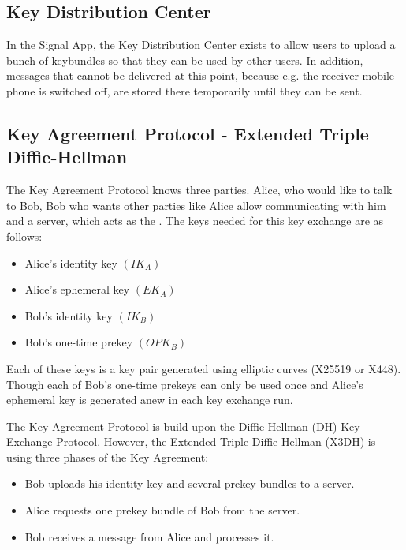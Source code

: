 \documentclass[12pt,oneside,a4paper,parskip]{scrbook}
\begin{document}



\subsection*{Key Distribution Center}
\label{subsec:KDC}

In the Signal App, the Key Distribution Center exists to allow users to upload a bunch of keybundles so that they can be used by other users. In addition, messages that cannot be delivered at this point, because e.g. the receiver mobile phone is switched off, are stored there temporarily until they can be sent.

\subsection{Key Agreement Protocol - Extended Triple Diffie-Hellman}
The Key Agreement Protocol knows three parties. Alice, who would like to talk to Bob, Bob who wants other parties like Alice allow communicating with him and a server, which acts as the . The keys needed for this key exchange are as follows:
\begin{itemize}
  \item Alice's identity key $   (IK_{A})  $
  \item Alice's ephemeral key $   ({EK_{A}})  $
  \item Bob's identity key $   ({IK_{B}})  $ 
  \item Bob's one-time prekey $   ({OPK_{B}})  $
\end{itemize}

Each of these keys is a key pair generated using elliptic curves (X25519 or X448). Though each of Bob's one-time prekeys can only be used once and Alice's ephemeral key is generated anew in each key exchange run.

The Key Agreement Protocol is build upon the Diffie-Hellman (DH) Key Exchange Protocol. However, the Extended Triple Diffie-Hellman (X3DH) is using three phases of the Key Agreement:
\begin{itemize}
  \item Bob uploads his identity key and several prekey bundles to a server.
  \item Alice requests one prekey bundle of Bob from the server.
  \item Bob receives a message from Alice and processes it.
\end{itemize}
\end{document}
